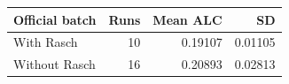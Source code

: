 \begin{tabular}{lrrr}
\toprule
Official batch & Runs & Mean ALC & SD\\
\midrule
With Rasch & 10 & 0.19107 & 0.01105\\
Without Rasch & 16 & 0.20893 & 0.02813\\
\bottomrule
\end{tabular}

